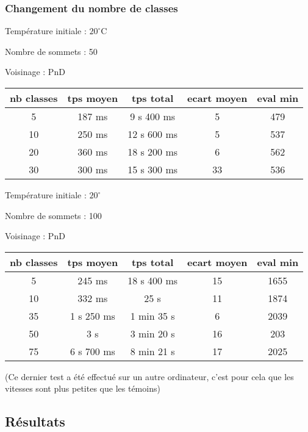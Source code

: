 \documentclass[12pt]{article}
\begin{document}
\subsubsection*{Changement du nombre de classes}

Température initiale : $20^\circ$C

Nombre de sommets : 50 

Voisinage : PnD
\bigskip

\begin{tabular}{|c|c|c|c|c|}
	\hline 
	nb classes & tps moyen & tps total & ecart moyen & eval min\\
	\hline
	5 & 187 ms & 9 s 400 ms & 5 & 479 \\
	\hline
	10  &  250   ms   &  12  s   600 ms   &  5   &  537   \\
	\hline
	20 &  360   ms   &  18 s  200  ms    &  6   &   562  \\
	\hline
	30  &   300 ms  &  15 s  300  ms   &  33   &    536 \\
	\hline
\end{tabular}

\bigskip

Température initiale : $20^\circ$

Nombre de sommets : 100 

Voisinage : PnD
\bigskip

\begin{tabular}{|c|c|c|c|c|}
	\hline 
	nb classes & tps moyen & tps total & ecart moyen & eval min\\
	\hline
	5 & 245 ms & 18 s 400 ms & 15 & 1655 \\
	\hline
	10  &  332   ms   &  25  s  &  11   &  1874   \\
	\hline
	35  &   1 s 250 ms   & 1 min 35  s &   6  &   2039  \\
	\hline
	50  &   3 s & 3 min  20 s &   16 &   203  \\
	\hline
	75  &   6 s 700 ms & 8 min  21 s  &  17   &  2025   \\
	\hline
\end{tabular}

\bigskip 
(Ce dernier test a été effectué sur un autre ordinateur, c’est pour cela que les vitesses sont plus petites que les témoins)

\subsection{Résultats}

\end{document}
